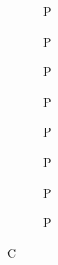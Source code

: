 \documentclass{article}
\begin{document}
\begin{figure}
  \centering
  \begin{subfigure}[b]{0.24\textwidth}P\end{subfigure}
  \hfill
  \begin{subfigure}[b]{0.24\textwidth}P\end{subfigure}
  \hfill
  \begin{subfigure}[b]{0.24\textwidth}P\end{subfigure}
  \hfill
  \begin{subfigure}[b]{0.24\textwidth}P\end{subfigure}

  {\small {} \hfill {}}

  \begin{subfigure}[b]{0.24\textwidth}P\end{subfigure}
  \hfill
  \begin{subfigure}[b]{0.24\textwidth}P\end{subfigure}
  \hfill
  \begin{subfigure}[b]{0.24\textwidth}P\end{subfigure}
  \hfill
  \begin{subfigure}[b]{0.24\textwidth}P\end{subfigure}

  {\small {} \hfill {}}
  \caption{C}
\end{figure}
\end{document}
